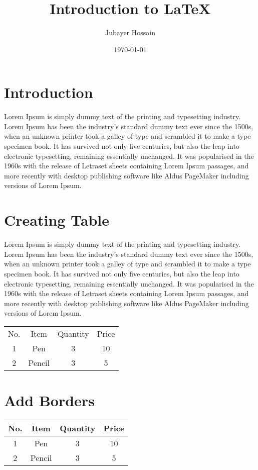 \documentclass{article}
\title{Introduction to {\LaTeX}}
\author{Jubayer Hossain}
\date{\today}
\begin{document}
	\maketitle 
	
	\section{Introduction} 
	Lorem Ipsum is simply dummy text of the printing and typesetting industry. 
	Lorem Ipsum has been the industry's standard dummy text ever since the 
	1500s, 
	when an unknown printer took a galley of type and scrambled it to make a 
	type 
	specimen book. It has survived not only five centuries, but also the leap 
	into 
	electronic typesetting, remaining essentially unchanged. It was popularised 
	in 
	the 1960s with the release of Letraset sheets containing Lorem Ipsum 
	passages, 
	and more recently with desktop publishing software like Aldus PageMaker 
	including versions of Lorem Ipsum.
	
	\section{Creating Table} 
	Lorem Ipsum is simply dummy text of the printing and typesetting industry. 
	Lorem Ipsum has been the industry's standard dummy text ever since the 
	1500s, 
	when an unknown printer took a galley of type and scrambled it to make a 
	type 
	specimen book. It has survived not only five centuries, but also the leap 
	into 
	electronic typesetting, remaining essentially unchanged. It was popularised 
	in 
	the 1960s with the release of Letraset sheets containing Lorem Ipsum 
	passages, 
	and more recently with desktop publishing software like Aldus PageMaker 
	including versions of Lorem Ipsum.
	

	\begin{tabular}{cccc}
		
		No. & Item & Quantity & Price \\

		1 & Pen & 3 & 10 \\
		2 & Pencil & 3  & 5 \\

	\end{tabular}


	
	
	\section{Add Borders} 
	\begin{tabular}{|c|c|c|c|}
		\hline 
		No. & Item & Quantity & Price \\
		\hline 
		1 & Pen & 3 & 10 \\
		\hline
		2 & Pencil & 3  & 5 \\
		\hline
		
	\end{tabular}
	
\end{document}
